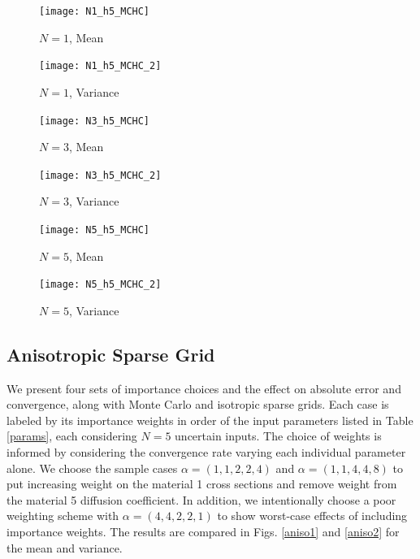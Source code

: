 \documentclass{anstrans}
\begin{document}
  \begin{figure}[htb]
   \texttt{[image: N1\_h5\_MCHC]}
   \caption{$N=1$, Mean}
   \label{n1mean}
  \end{figure}
  \begin{figure}[htb]
   \texttt{[image: N1\_h5\_MCHC\_2]}
   \caption{$N=1$, Variance}
   \label{n1var}
  \end{figure}

  \begin{figure}[htb]
   \texttt{[image: N3\_h5\_MCHC]}
   \caption{$N=3$, Mean}
   \label{n3mean}
  \end{figure}
  \begin{figure}[htb]
   \texttt{[image: N3\_h5\_MCHC\_2]}
   \caption{$N=3$, Variance}
   \label{n3var}
  \end{figure}


  \begin{figure}[htb]
   \texttt{[image: N5\_h5\_MCHC]}
   \caption{$N=5$, Mean}
   \label{n5mean}
  \end{figure}
  \begin{figure}[htb]
   \texttt{[image: N5\_h5\_MCHC\_2]}
   \caption{$N=5$, Variance}
   \label{n5var}
  \end{figure}
  
\subsection{Anisotropic Sparse Grid}
We present four sets of importance choices and the effect on absolute error and convergence, along with Monte Carlo and isotropic sparse grids.  Each case is labeled by its importance weights in order of the input parameters listed in Table \ref{params}, each considering $N=5$ uncertain inputs. The choice of weights is informed by considering the convergence rate varying each individual parameter alone.  We choose the sample cases $\alpha=(1,1,2,2,4)$ and $\alpha=(1,1,4,4,8)$ to put increasing weight on the material 1 cross sections and remove weight from the material 5 diffusion coefficient.  In addition, we intentionally choose a poor weighting scheme with $\alpha=(4,4,2,2,1)$ to show worst-case effects of including importance weights.  The results are compared in Figs. \ref{aniso1} and \ref{aniso2} for the mean and variance. 
\end{document}
